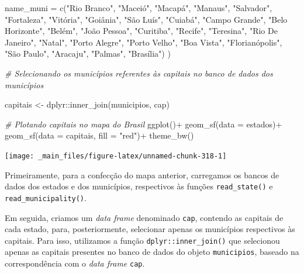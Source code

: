 \documentclass[
  brazilian,
]{book}
\newenvironment{Shaded}{\begin{snugshade}}{\end{snugshade}}
\newcommand{\AttributeTok}[1]{\textcolor[rgb]{0.77,0.63,0.00}{#1}}
\newcommand{\CommentTok}[1]{\textcolor[rgb]{0.56,0.35,0.01}{\textit{#1}}}
\newcommand{\FunctionTok}[1]{\textcolor[rgb]{0.00,0.00,0.00}{#1}}
\newcommand{\NormalTok}[1]{#1}
\newcommand{\OtherTok}[1]{\textcolor[rgb]{0.56,0.35,0.01}{#1}}
\newcommand{\SpecialCharTok}[1]{\textcolor[rgb]{0.00,0.00,0.00}{#1}}
\newcommand{\StringTok}[1]{\textcolor[rgb]{0.31,0.60,0.02}{#1}}
\begin{document}
\begin{Shaded}
\begin{Highlighting}[]
  \AttributeTok{name\_muni =} \FunctionTok{c}\NormalTok{(}\StringTok{"Rio Branco"}\NormalTok{, }\StringTok{"Maceió"}\NormalTok{, }\StringTok{"Macapá"}\NormalTok{, }\StringTok{"Manaus"}\NormalTok{, }\StringTok{"Salvador"}\NormalTok{, }\StringTok{"Fortaleza"}\NormalTok{, }\StringTok{"Vitória"}\NormalTok{, }\StringTok{"Goiânia"}\NormalTok{, }\StringTok{"São Luís"}\NormalTok{, }\StringTok{"Cuiabá"}\NormalTok{, }\StringTok{"Campo Grande"}\NormalTok{, }\StringTok{"Belo Horizonte"}\NormalTok{, }\StringTok{"Belém"}\NormalTok{, }\StringTok{"João Pessoa"}\NormalTok{, }\StringTok{"Curitiba"}\NormalTok{, }\StringTok{"Recife"}\NormalTok{, }\StringTok{"Teresina"}\NormalTok{, }\StringTok{"Rio De Janeiro"}\NormalTok{, }\StringTok{"Natal"}\NormalTok{, }\StringTok{"Porto Alegre"}\NormalTok{, }\StringTok{"Porto Velho"}\NormalTok{, }\StringTok{"Boa Vista"}\NormalTok{, }\StringTok{"Florianópolis"}\NormalTok{, }\StringTok{"São Paulo"}\NormalTok{, }\StringTok{"Aracaju"}\NormalTok{, }\StringTok{"Palmas"}\NormalTok{, }\StringTok{"Brasília"}\NormalTok{)}
\NormalTok{)}

\CommentTok{\# Selecionando os municípios referentes às capitais no banco de dados dos municípios}

\NormalTok{capitais }\OtherTok{\textless{}{-}}\NormalTok{ dplyr}\SpecialCharTok{::}\FunctionTok{inner\_join}\NormalTok{(municipios, cap)}


\CommentTok{\# Plotando capitais no mapa do Brasil}
\FunctionTok{ggplot}\NormalTok{()}\SpecialCharTok{+}
  \FunctionTok{geom\_sf}\NormalTok{(}\AttributeTok{data =}\NormalTok{ estados)}\SpecialCharTok{+}
  \FunctionTok{geom\_sf}\NormalTok{(}\AttributeTok{data =}\NormalTok{ capitais, }\AttributeTok{fill =} \StringTok{"red"}\NormalTok{)}\SpecialCharTok{+}
  \FunctionTok{theme\_bw}\NormalTok{()}
\end{Highlighting}
\end{Shaded}

\begin{center}\texttt{[image: \_main\_files/figure-latex/unnamed-chunk-318-1]} \end{center}

Primeiramente, para a confecção do mapa anterior, carregamos os bancos de dados dos estados e dos municípios, respectivos às funções \texttt{read\_state()} e \texttt{read\_municipality()}.

Em seguida, criamos um \emph{data frame} denominado \texttt{cap}, contendo as capitais de cada estado, para, posteriormente, selecionar apenas os municípios respectivos às capitais. Para isso, utilizamos a função \texttt{dplyr::inner\_join()} que selecionou apenas as capitais presentes no banco de dados do objeto \texttt{municipios}, baseado na correspondência com o \emph{data frame} \texttt{cap}.
\end{document}
